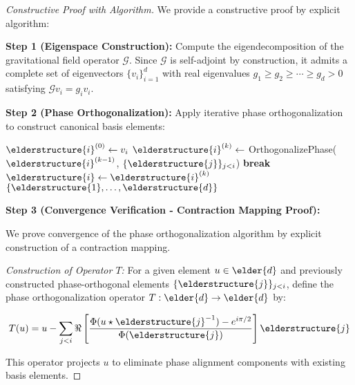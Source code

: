 \begin{proof}[Constructive Proof with Algorithm]
We provide a constructive proof by explicit algorithm:

\textbf{Step 1 (Eigenspace Construction):} 
Compute the eigendecomposition of the gravitational field operator $\mathcal{G}$. Since $\mathcal{G}$ is self-adjoint by construction, it admits a complete set of eigenvectors $\{v_i\}_{i=1}^{d}$ with real eigenvalues $g_1 \geq g_2 \geq \cdots \geq g_d > 0$ satisfying $\mathcal{G}v_i = g_i v_i$.

\textbf{Step 2 (Phase Orthogonalization):}
Apply iterative phase orthogonalization to construct canonical basis elements:
\begin{algorithm}[H]
\begin{algorithmic}[1]
        \State $\elderstructure{i}^{(0)} \leftarrow v_i$ 
            \State $\elderstructure{i}^{(k)} \leftarrow$ OrthogonalizePhase($\elderstructure{i}^{(k-1)}$, $\{\elderstructure{j}\}_{j<i}$)
                \State \textbf{break} 
            \EndIf
        \EndFor
        \State $\elderstructure{i} \leftarrow \elderstructure{i}^{(k)}$
    \EndFor
    \State \Return $\{\elderstructure{1}, \ldots, \elderstructure{d}\}$
\EndProcedure
\end{algorithmic}
\end{algorithm}

\textbf{Step 3 (Convergence Verification - Contraction Mapping Proof):}

We prove convergence of the phase orthogonalization algorithm by explicit construction of a contraction mapping.

\textit{Construction of Operator $T$:}
For a given element $u \in \elder{d}$ and previously constructed phase-orthogonal elements $\{\elderstructure{j}\}_{j<i}$, define the phase orthogonalization operator $T: \elder{d} \rightarrow \elder{d}$ by:

$$T(u) = u - \sum_{j<i} \Re\left[\frac{\Phi(u \star \elderstructure{j}^{-1}) - e^{i\pi/2}}{\Phi(\elderstructure{j})}\right] \elderstructure{j}$$

This operator projects $u$ to eliminate phase alignment components with existing basis elements.


\end{proof}

